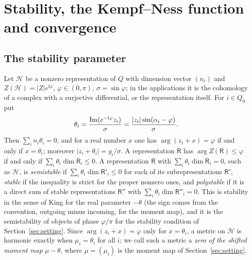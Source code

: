 \section{Stability, the Kempf--Ness function and convergence}\label{sec:convergence}

\subsection{The stability parameter}
Let $\mathcal H$ be a nonzero representation of $Q$ with dimension vector
$(n_i)$ and $Z(\mathcal H)=|Z|e^{\ii\varphi}$, $\varphi\in(0,\pi)$,
$\sigma=\sin\varphi$; in the applications it is the cohomology of a complex
with a surjective differential, or the representation itself. For $i\in Q_0$
put
\[
 \theta_i=\frac{\operatorname{Im}(e^{-\mathrm i\varphi}z_i)}\sigma=\frac{|z_i|\sin(\alpha_i-\varphi)}\sigma .
\]
Then $\sum_in_i\theta_i=0$, and for a real number $x$ one has
$\arg(z_i+x)=\varphi$ if and only if $x=\theta_i$; moreover
$|z_i+\theta_i|=y_i/\sigma$. A representation $\mathsf R$ has
$\arg Z(\mathsf R)\leq\varphi$ if and only if
$\sum_i\theta_i\dim\mathsf R_i\leq0$. A representation $\mathsf R$ with
$\sum_i\theta_i\dim\mathsf R_i=0$, such as $\mathcal H$, is \emph{semistable}
if $\sum_i\theta_i\dim\mathsf R'_i\leq0$ for each of its subrepresentations
$\mathsf R'$, \emph{stable} if the inequality is strict for the proper
nonzero ones, and \emph{polystable} if it is a direct sum of stable
representations $\mathsf R''$ with $\sum_i\theta_i\dim\mathsf R''_i=0$. This
is stability in the sense of King \cite[Definition~1.1]{kin94} for the real
parameter $-\theta$ (the sign comes from the convention, outgoing minus
incoming, for the moment map), and it is the semistability of objects of
phase $\varphi/\pi$ for the stability condition of
Section~\ref{sec:setting}. Since $\arg(z_i+x)=\varphi$ only for
$x=\theta_i$, a metric on $\mathcal H$ is harmonic exactly when $\mu_i=\theta_i$ for all $i$; we call such a metric
a \emph{zero of the shifted moment map} $\mu-\theta$, where $\mu=(\mu_i)$ is
the moment map of Section~\ref{sec:setting}.

